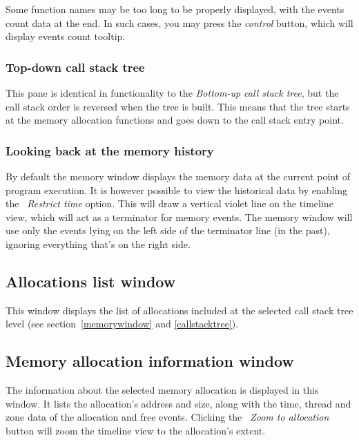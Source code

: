 \documentclass[hidelinks,titlepage,a4paper]{article}
\begin{document}
Some function names may be too long to be properly displayed, with the events count data at the end. In such cases, you may press the \emph{control} button, which will display events count tooltip.

\subsubsection{Top-down call stack tree}

This pane is identical in functionality to the \emph{Bottom-up call stack tree}, but the call stack order is reversed when the tree is built. This means that the tree starts at the memory allocation functions and goes down to the call stack entry point.

\subsubsection{Looking back at the memory history}

By default the memory window displays the memory data at the current point of program execution. It is however possible to view the historical data by enabling the \emph{\faHistory{}~Restrict time} option. This will draw a vertical violet line on the timeline view, which will act as a terminator for memory events. The memory window will use only the events lying on the left side of the terminator line (in the past), ignoring everything that's on the right side.

\subsection{Allocations list window}
\label{alloclist}

This window displays the list of allocations included at the selected call stack tree level (see section~\ref{memorywindow} and \ref{callstacktree}).

\subsection{Memory allocation information window}
\label{memallocinfo}

The information about the selected memory allocation is displayed in this window. It lists the allocation's address and size, along with the time, thread and zone data of the allocation and free events. Clicking the \emph{\faMicroscope{}~Zoom to allocation} button will zoom the timeline view to the allocation's extent.
\end{document}
